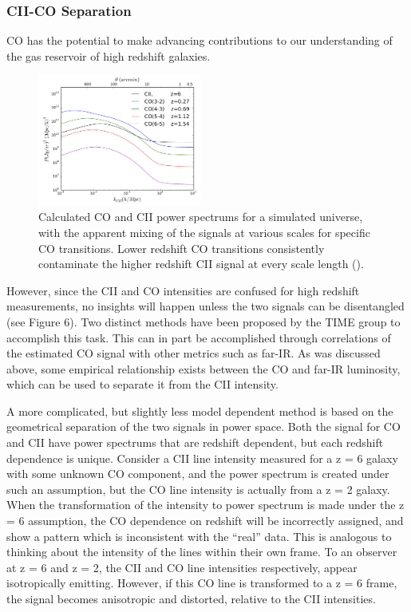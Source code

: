 \documentclass[manuscript]{aastex}
\begin{document}
\subsubsection{CII-CO Separation}
CO has the potential to make advancing contributions to our understanding of the gas reservoir of high redshift galaxies. 
\begin{figure}
\vspace{-0.8cm}
  \begin{center}
    \includegraphics[width=0.48\textwidth]{cheng1.png}
  \end{center}
  \caption[Calculated CO and CII power spectrums, showing the difficulty in separating the two signals. -(\cite{Cheng2016})]{Calculated CO and CII power spectrums for a simulated universe, with the apparent mixing of the signals at various scales for specific CO transitions. Lower redshift CO transitions consistently contaminate the higher redshift CII signal at every scale length (\cite{Cheng2016}).}
\end{figure}
However, since the CII and CO intensities are confused for high redshift measurements, no insights will happen unless the two signals can be disentangled (see Figure 6). Two distinct methods have been proposed by the TIME group to accomplish this task. This can in part be accomplished through correlations of the estimated CO signal with other metrics such as far-IR. As was discussed above, some empirical relationship exists between the CO and far-IR luminosity, which can be used to separate it from the CII intensity.  

A more complicated, but slightly less model dependent method is based on the geometrical separation of the two signals in power space. Both the signal for CO and CII have power spectrums that are redshift dependent, but each redshift dependence is unique. Consider a CII line intensity measured for a z = 6 galaxy with some unknown CO component, and the power spectrum is created under such an assumption, but the CO line intensity is actually from a z = 2 galaxy. When the transformation of the intensity to power spectrum is made under the z = 6 assumption, the CO dependence on redshift will be incorrectly assigned, and show a pattern which is inconsistent with the ``real'' data. This is analogous to thinking about the intensity of the lines within their own frame. To an observer at z = 6 and z = 2, the CII and CO line intensities respectively, appear isotropically emitting. However, if this CO line is transformed to a z = 6 frame, the signal becomes anisotropic and distorted, relative to the CII intensities.  
\end{document}
